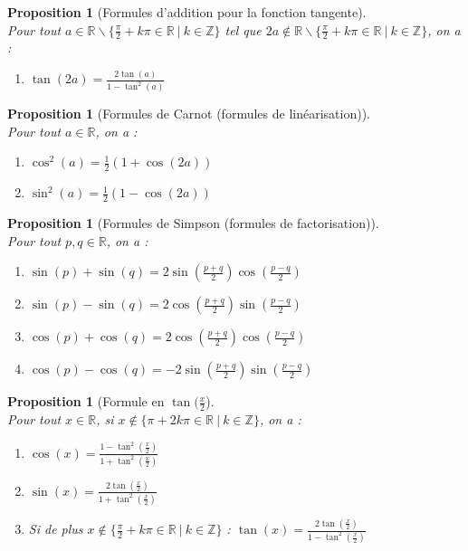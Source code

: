 \documentclass[a4paper,fontsize=13pt]{scrreprt}
\theoremstyle{plain}
\newtheorem{pro}[subsection]{Proposition}
\theoremstyle{definition}
\newcommand{\zz}{\mathbb{Z}}
\newcommand{\rr}{\mathbb{R}}
\begin{document}
\begin{pro} [Formules d'addition pour la fonction tangente]~\\
Pour tout $a \in \rr \backslash \{\frac{\pi}{2}+k\pi \in \rr~|~k \in \zz\}$ tel que $2a \notin \rr \backslash \{\frac{\pi}{2}+k\pi \in \rr~|~k \in \zz\}$, on a :
\begin{enumerate}
\item $\tan(2a) = \frac{2\tan(a)}{1-\tan^2(a)}$
\end{enumerate}
\end{pro}

\begin{pro} [Formules de Carnot (formules de linéarisation)]~\\
Pour tout $a \in \rr$, on a :
\begin{enumerate}
\item $\cos^2(a) = \frac{1}{2}(1+\cos(2a))$
\item $\sin^2(a) = \frac{1}{2}(1-\cos(2a))$
\end{enumerate}
\end{pro}

\begin{pro} [Formules de Simpson (formules de factorisation)]~\\
Pour tout $p,q \in \rr$, on a :
\begin{enumerate}
\item $\sin(p)+\sin(q) = 2 \sin(\frac{p+q}{2})\cos(\frac{p-q}{2})$
\item $\sin(p)-\sin(q) = 2 \cos(\frac{p+q}{2})\sin(\frac{p-q}{2})$
\item $\cos(p)+\cos(q) = 2 \cos(\frac{p+q}{2})\cos(\frac{p-q}{2})$
\item $\cos(p)-\cos(q) = -2 \sin(\frac{p+q}{2})\sin(\frac{p-q}{2})$
\end{enumerate}
\end{pro}

\begin{pro} [Formule en $\tan(\frac{x}{2}$]~\\
Pour tout $x \in \rr$, si $x \notin \{\pi+2k\pi \in \rr~|~k \in \zz \}$, on a :
\begin{enumerate}
\item $\cos(x) = \frac{1-\tan^2(\frac{x}{2})}{1+\tan^2(\frac{x}{2})}$
\item $\sin(x) = \frac{2\tan(\frac{x}{2})}{1+\tan^2(\frac{x}{2})}$
\item Si de plus $x \notin \{\frac{\pi}{2}+k\pi \in \rr~|~k \in \zz \}$ : $\tan(x) = \frac{2\tan(\frac{x}{2})}{1-\tan^2(\frac{x}{2})}$
\end{enumerate}
\end{pro}
\end{document}
